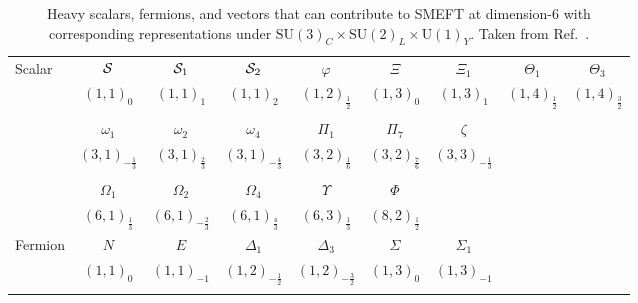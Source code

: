 \begin{table}[ht]
\centering
\caption{Heavy scalars, fermions, and vectors that can contribute to SMEFT at dimension-6 
with corresponding representations under $\text{SU}(3)_C \times \text{SU}(2)_L \times \text{U}(1)_Y$.  
Taken from Ref.~\cite{deBlas:2017xtg}.}
\label{tab:Granadadict}
    {\small
      \begin{tabular}{l|cccccccc}
        Scalar &
        ${\cal S}$ &
        ${\cal S}_1$ &
        ${\cal S}_2$ &
        $\varphi$ &
        $\Xi$ &
        $\Xi_1$ &
        $\Theta_1$ &
        $\Theta_3$ \\
         &
        $\left(1,1\right)_0$ &
        $\left(1,1\right)_1$ &
        $\left(1,1\right)_2$ &
        $\left(1,2\right)_{\frac 12}$ &
        $\left(1,3\right)_0$ &
        $\left(1,3\right)_1$ &
        $\left(1,4\right)_{\frac 12}$ &
        $\left(1,4\right)_{\frac 32}$ \\[1.3mm]
        &&&&&&&\\[-0.4cm]
         &
        ${\omega}_{1}$ &
        ${\omega}_{2}$ &
        ${\omega}_{4}$ &
        $\Pi_1$ &
        $\Pi_7$ &
        $\zeta$ &
        & \\ 
         &
        $\left(3,1\right)_{-\frac 13}$ &
        $\left(3,1\right)_{\frac 23}$ &
        $\left(3,1\right)_{-\frac 43}$ &
        $\left(3,2\right)_{\frac 16}$ &
        $\left(3,2\right)_{\frac 76}$ &
        $\left(3,3\right)_{-\frac 13}$ \\[1.3mm]
        &&&&&&&\\[-0.4cm]
         &
        $\Omega_{1}$ &
        $\Omega_{2}$ &
        $\Omega_{4}$ &
        $\Upsilon$ &
        $\Phi$ &
        &
        & \\
         &
        $\left(6,1\right)_{\frac 13}$ &
        $\left(6,1\right)_{-\frac 23}$ &
        $\left(6,1\right)_{\frac 43}$ &
        $\left(6,3\right)_{\frac 13}$ &
        $\left(8,2\right)_{\frac 12}$ \\[1.3mm]
\hline
Fermion &
        $N$ & $E$ & $\Delta_1$ & $\Delta_3$ & $\Sigma$ & $\Sigma_1$ & & \\
         &
        $\left(1, 1\right)_0$ &
        $\left(1, 1\right)_{-1}$ &
        $\left(1, 2\right)_{-\frac{1}{2}}$ &
        $\left(1, 2\right)_{-\frac{3}{2}}$ &
        $\left(1, 3\right)_0$ &
        $\left(1, 3\right)_{-1}$ & & \\[1.3mm]
        &&&&&&&\\[-0.4cm]

\end{tabular}}
\end{table}
